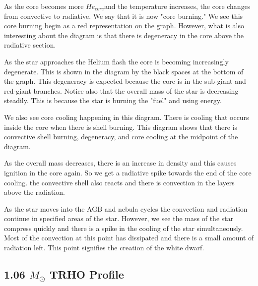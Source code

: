 \documentclass[fleqn,usenatbib]{mnras}
\begin{document}
\par As the core becomes more $ He_{core} $and the temperature increases, the core changes from convective to radiative.  We say that it is now "core burning." We see this core burning begin as a red representation on the graph.  However, what is also interesting about the diagram is that there is degeneracy in the core above the radiative section. 

\par As the star approaches the Helium flash the core is becoming increasingly degenerate.  This is shown in the diagram by the black spaces at the bottom of the graph.  This degeneracy is expected because the core is in the sub-giant and red-giant branches.  Notice also that the overall mass of the star is decreasing steadily.  This is because the star is burning the "fuel" and using energy.

\par We also see core cooling happening in this diagram. There is cooling that occurs inside the core when there is shell burning.  This diagram shows that there is convective shell burning, degeneracy, and core cooling at the midpoint of the diagram. 
\par As the overall mass decreases, there is an increase in density and this causes ignition in the core again.  So we get a radiative spike towards the end of the core cooling. the convective shell also reacts and there is convection in the layers above the radiation.
\par As the star moves into the AGB and nebula cycles the convection and radiation continue in specified areas of the star.  However, we see the mass of the star compress quickly and there is a spike in the cooling of the star simultaneously. Most of the convection at this point has dissipated and there is a small amount of radiation left.  This point signifies the creation of the white dwarf.

\subsection{1.06 \(M_\odot\) TRHO Profile}
\end{document}
